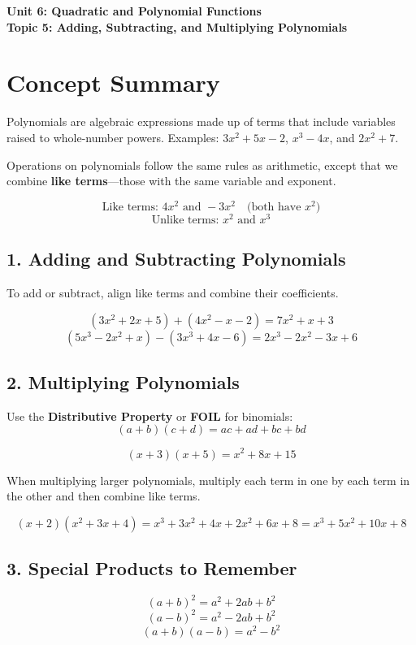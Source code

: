 \documentclass[14pt]{extarticle}
\begin{document}
\raggedright
{}

\begin{center}
    \LARGE \textbf{Unit 6: Quadratic and Polynomial Functions} \\[6pt]
    \Large \textbf{Topic 5: Adding, Subtracting, and Multiplying Polynomials}
\end{center}

\vspace{1em}

\section*{Concept Summary}

Polynomials are algebraic expressions made up of terms that include variables raised to whole-number powers.  
Examples: \(3x^2 + 5x - 2\), \(x^3 - 4x\), and \(2x^2 + 7\).

Operations on polynomials follow the same rules as arithmetic, except that we combine \textbf{like terms}—those with the same variable and exponent.

\[
\text{Like terms: } 4x^2 \text{ and } -3x^2 \quad \text{(both have } x^2\text{)}
\]
\[
\text{Unlike terms: } x^2 \text{ and } x^3
\]

\subsection*{1. Adding and Subtracting Polynomials}
To add or subtract, align like terms and combine their coefficients.

\[
(3x^2 + 2x + 5) + (4x^2 - x - 2) = 7x^2 + x + 3
\]
\[
(5x^3 - 2x^2 + x) - (3x^3 + 4x - 6) = 2x^3 - 2x^2 - 3x + 6
\]

\subsection*{2. Multiplying Polynomials}
Use the \textbf{Distributive Property} or \textbf{FOIL} for binomials:
\[
(a + b)(c + d) = ac + ad + bc + bd
\]

\[
(x + 3)(x + 5) = x^2 + 8x + 15
\]

When multiplying larger polynomials, multiply each term in one by each term in the other and then combine like terms.

\[
(x + 2)(x^2 + 3x + 4) = x^3 + 3x^2 + 4x + 2x^2 + 6x + 8 = x^3 + 5x^2 + 10x + 8
\]

\subsection*{3. Special Products to Remember}
\[
(a + b)^2 = a^2 + 2ab + b^2
\]
\[
(a - b)^2 = a^2 - 2ab + b^2
\]
\[
(a + b)(a - b) = a^2 - b^2
\]
\end{document}
